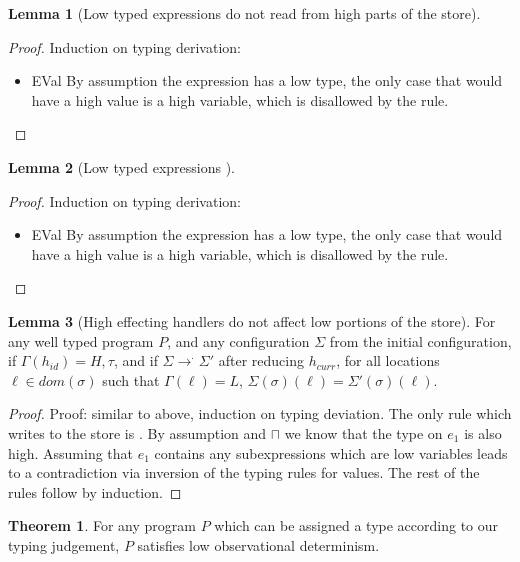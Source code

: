 \documentclass[conference]{IEEEtran}
\newcommand{\code}[1]{\text{\lstinline!#1!}}
\theoremstyle{definition}
\newtheorem{lem}{Lemma}[section]
\newtheorem{thm}{Theorem}[section]
\newcommand{\loc}{\ell}
\newcommand{\treduce}{\rightarrow}
\begin{document}
\begin{lem}[Low typed expressions do not read from high parts of the
  store]
\end{lem}

\begin{proof}
  Induction on typing derivation:
  \begin{itemize}
  \item{EVal} By assumption the expression has a low type, the only
    case that would have a high value is a high variable, which is
    disallowed by the \code{VVar} rule.
  \end{itemize}
\end{proof}

\begin{lem}[Low typed expressions ]
\end{lem}

\begin{proof}
  Induction on typing derivation:
  \begin{itemize}
  \item{EVal} By assumption the expression has a low type, the only
    case that would have a high value is a high variable, which is
    disallowed by the \code{VVar} rule.
  \end{itemize}
\end{proof}

\begin{lem}[High effecting handlers do not affect low portions of the
  store]
  For any well typed program $P$, and any configuration $\Sigma$ from
  the initial configuration, if $\Gamma(h_{id}) = H , \tau$, and if
  $\Sigma \treduce^{\cdot} \Sigma'$ after reducing $h_{curr}$, for all
  locations $\loc \in dom(\sigma)$ such that $\Gamma(\loc) = L$,
  $\Sigma(\sigma)(\loc) = \Sigma'(\sigma)(\loc)$.
\end{lem}

\begin{proof}
  Proof: similar to above, induction on typing deviation.  The only
  rule which writes to the store is \code{EAsgn}.  By assumption and
  $\sqcap$ we know that the type on $e_1$ is also high.  Assuming that
  $e_1$ contains any subexpressions which are low variables leads to a
  contradiction via inversion of the typing rules for values.  The
  rest of the rules follow by induction.
\end{proof}

\begin{thm}
  For any program $P$ which can be assigned a type according to our
  typing judgement, $P$ satisfies low observational determinism.
\end{thm}
\end{document}
